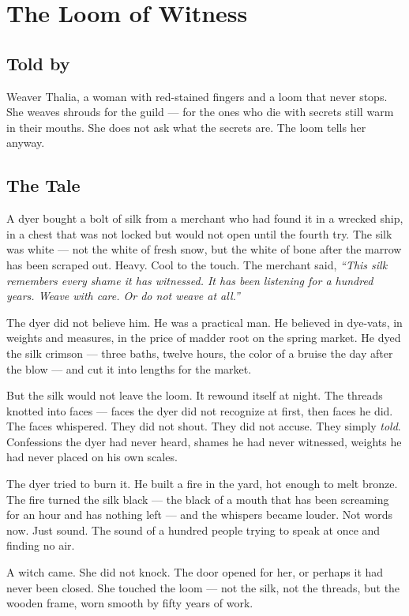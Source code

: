\chapter{The Loom of Witness}

\section*{Told by}
Weaver Thalia, a woman with red-stained fingers and a loom that never stops. She weaves shrouds for the guild --- for the ones who die with secrets still warm in their mouths. She does not ask what the secrets are. The loom tells her anyway.

\section*{The Tale}

A dyer bought a bolt of silk from a merchant who had found it in a wrecked ship, in a chest that was not locked but would not open until the fourth try. The silk was white --- not the white of fresh snow, but the white of bone after the marrow has been scraped out. Heavy. Cool to the touch. The merchant said, \textit{``This silk remembers every shame it has witnessed. It has been listening for a hundred years. Weave with care. Or do not weave at all.''}

The dyer did not believe him. He was a practical man. He believed in dye-vats, in weights and measures, in the price of madder root on the spring market. He dyed the silk crimson --- three baths, twelve hours, the color of a bruise the day after the blow --- and cut it into lengths for the market.

But the silk would not leave the loom. It rewound itself at night. The threads knotted into faces --- faces the dyer did not recognize at first, then faces he did. The faces whispered. They did not shout. They did not accuse. They simply \textit{told}. Confessions the dyer had never heard, shames he had never witnessed, weights he had never placed on his own scales.

The dyer tried to burn it. He built a fire in the yard, hot enough to melt bronze. The fire turned the silk black --- the black of a mouth that has been screaming for an hour and has nothing left --- and the whispers became louder. Not words now. Just sound. The sound of a hundred people trying to speak at once and finding no air.

A witch came. She did not knock. The door opened for her, or perhaps it had never been closed. She touched the loom --- not the silk, not the threads, but the wooden frame, worn smooth by fifty years of work.

